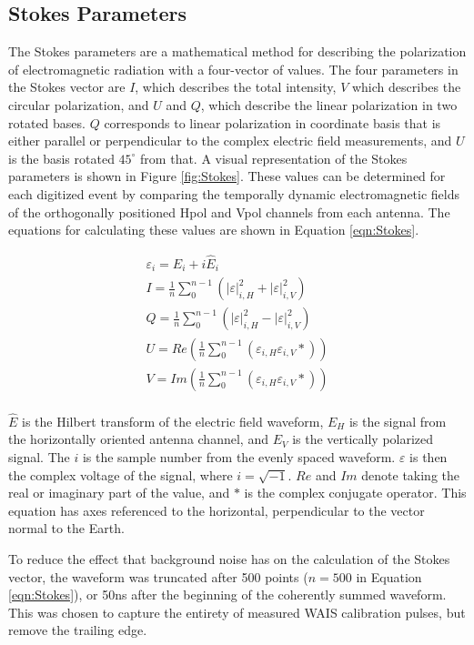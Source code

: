 	\subsection{Stokes Parameters}
		The Stokes parameters are a mathematical method for describing the polarization of electromagnetic radiation with a four-vector of values.  The four parameters in the Stokes vector are $I$, which describes the total intensity, $V$ which describes the circular polarization, and $U$ and $Q$, which describe the linear polarization in two rotated bases.  $Q$ corresponds to linear polarization in coordinate basis that is either parallel or perpendicular to the complex electric field measurements, and $U$ is the basis rotated $45^{\circ}$ from that.  A visual representation of the Stokes parameters is shown in Figure \ref{fig:Stokes}.  These values can be determined for each digitized event by comparing the temporally dynamic electromagnetic fields of the orthogonally positioned Hpol and Vpol channels from each antenna.  The equations for calculating these values are shown in Equation \ref{eqn:Stokes}.
		
	\begin{gather*}
	\varepsilon_{i} = E_{i} + i\hat{E}_{i} \\
	I =	\frac{1}{n}\sum^{n-1}_{0}(|\varepsilon|^{2}_{i,H} + |\varepsilon|^{2}_{i,V}) \\
	Q =	\frac{1}{n}\sum^{n-1}_{0}(|\varepsilon|^{2}_{i,H} - |\varepsilon|^{2}_{i,V}) \\
	U =	Re(\frac{1}{n}\sum^{n-1}_{0}(\varepsilon_{i,H} \varepsilon_{i,V}*)) \\
	V =	Im(\frac{1}{n}\sum^{n-1}_{0}(\varepsilon_{i,H} \varepsilon_{i,V}*)) \\
	\label{eqn:Stokes}
	\end{gather*}

		
	 $\hat{E}$ is the Hilbert transform of the electric field waveform, $E_{H}$ is the signal from the horizontally oriented antenna channel, and $E_{V}$ is the vertically polarized signal.  The $i$ is the sample number from the evenly spaced waveform.  $\varepsilon$ is then the complex voltage of the signal, where $i=\sqrt{-1}$.  $Re$ and $Im$ denote taking the real or imaginary part of the value, and $*$ is the complex conjugate operator.  This equation has axes referenced to the horizontal, perpendicular to the vector normal to the Earth. \cite{PhysRevD.94.103010}
	 
	 To reduce the effect that background noise has on the calculation of the Stokes vector, the waveform was truncated after 500 points ($n=500$ in Equation \ref{eqn:Stokes}), or 50ns after the beginning of the coherently summed waveform.  This was chosen to capture the entirety of measured WAIS calibration pulses, but remove the trailing edge.
	 
